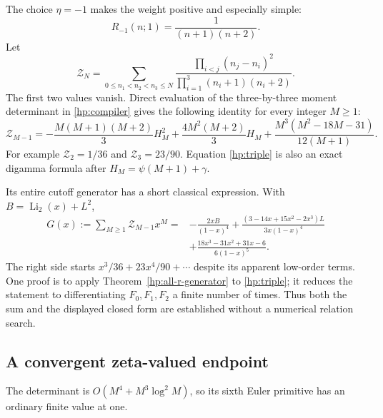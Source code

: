 The choice $\eta=-1$ makes the weight positive and especially
simple:
\[
 R_{-1}(n;1)=\frac1{(n+1)(n+2)}.
\]
Let
\[
 \mathcal Z_N=
 \sum_{0\le n_1<n_2<n_3\le N}
   \frac{\prod_{i<j}(n_j-n_i)^2}
        {\prod_{i=1}^3(n_i+1)(n_i+2)}.
\]
The first two values vanish. Direct evaluation of the three-by-three
moment determinant in \eqref{hp:compiler} gives the following identity
for every integer $M\ge1$:
\begin{equation}\label{hp:triple}
 \boxed{\displaystyle
 \mathcal Z_{M-1}
 =-\frac{M(M+1)(M+2)}3H_M^2
   +\frac{4M^2(M+2)}3H_M
   +\frac{M^3(M^2-18M-31)}{12(M+1)}.}
\end{equation}
For example $\mathcal Z_2=1/36$ and $\mathcal Z_3=23/90$.
Equation \eqref{hp:triple} is also an exact digamma formula
after $H_M=\psi(M+1)+\gamma$.

Its entire cutoff generator has a short classical expression.
With $B=\operatorname{Li}_2(x)+L^2$,
\begin{equation}\label{hp:triple-generator}
 \boxed{\begin{aligned}
 G(x):=\sum_{M\ge1}\mathcal Z_{M-1}x^M
 ={}&-\frac{2xB}{(1-x)^4}
  +\frac{(3-14x+15x^2-2x^3)L}{3x(1-x)^4}\\
 &+\frac{18x^3-31x^2+31x-6}{6(1-x)^5}.
 \end{aligned}}
\end{equation}
The right side starts $x^3/36+23x^4/90+\cdots$ despite its
apparent low-order terms. One proof is to apply
Theorem~\ref{hp:all-r-generator} to \eqref{hp:triple}; it reduces
the statement to differentiating $F_0,F_1,F_2$ a finite number
of times. Thus both the sum and the displayed closed form
are established without a numerical relation search.

\subsection{A convergent zeta-valued endpoint}

The determinant is $O(M^4+M^3\log^2 M)$, so its sixth Euler
primitive has an ordinary finite value at one.

